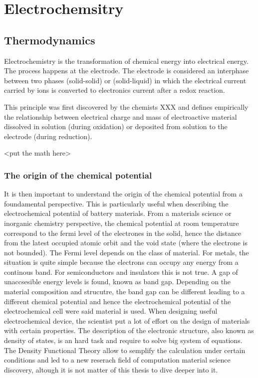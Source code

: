 \chapter{Electrochemsitry}
\minitoc

\section{Thermodynamics}

Electrochemistry is the transformation of chemical energy into electrical energy. The process happens at the electrode. The electrode is considered an interphase between two phases (solid-solid) or (solid-liquid) in which the electrical current carried by ions is converted to electronics current after a redox reaction.

This principle was first discovered by the chemists XXX and defines empirically the relationship between electrical charge and mass of electroactive material dissolved in solution (during oxidation) or deposited from solution to the electrode (during reduction).

<put the math here>


\subsection{The origin of the chemical potential}

It is then important to understand the origin of the chemical potential from a foundamental perspective. This is particularly useful when describing the electrochemical potential of battery materials. From a materials science or inorganic chemistry perspective, the chemical potential at room temperature correspond to the fermi level of the electrones in the solid, hence the distance from the latest occupied atomic orbit and the void state (where the electrone is not bounded).
The Fermi level depends on the class of material. For metals, the situation is quite simple because the electrons can occupy any energy from a continous band. For semiconductors and insulators this is not true. A gap of unaccsesible energy levels is found, known as band gap. Depending on the material composition and strucutre, the band gap can be different leading to a different chemical potential and hence the electrochemical potential of the electrochemical cell were said material is used. When designing useful electrochemical device, the scientist put a lot of effort on the design of materials with certain properties. The description of the electronic structure, also known as density of states, is an hard task and require to solve big system of equations. The Density Functional Theory allow to semplify the calculation under certain conditions and led to a new reserach field of computation material science discovery, altough it is not matter of this thesis to dive deeper into it. 

